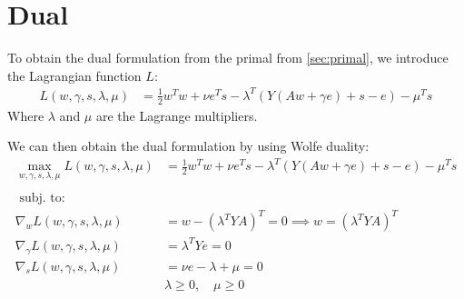 
\section{Dual}

To obtain the dual formulation from
the primal from \cref{sec:primal}, we
introduce the Lagrangian function $L$:
\begin{align*}
    L(w,\gamma,s,\lambda,\mu)
    &= \frac{1}{2} w^T w + \nu e^T s -
    \lambda^T \left(Y(Aw + \gamma e) + s - e\right) - \mu^T s
\end{align*}
Where $\lambda$ and $\mu$ are the Lagrange multipliers.

We can then obtain the dual formulation by using
Wolfe duality:
\begin{align*}
    \max_{w,\gamma,s,\lambda,\mu} L(w,\gamma,s,\lambda,\mu)
    &= \frac{1}{2} w^T w + \nu e^T s - \lambda^T \left(Y(Aw + \gamma e) + s - e\right) - \mu^T s \\
    \\
    \text{ subj. to: } \\
    \nabla_w L(w,\gamma,s,\lambda,\mu) &= w - \left(\lambda^T YA\right)^T = 0
    \implies w = \left(\lambda^T YA\right)^T \tag{c.1}\label{c1} \\
    \nabla_\gamma L(w,\gamma,s,\lambda,\mu) &= \lambda^T Ye = 0  \tag{c.2}\label{c2}\\
    \nabla_s L(w,\gamma,s,\lambda,\mu) &= \nu e - \lambda + \mu = 0  \tag{c.3}\label{c3}\\
                                       & \lambda \geq 0,\quad \mu \geq 0
\end{align*}


